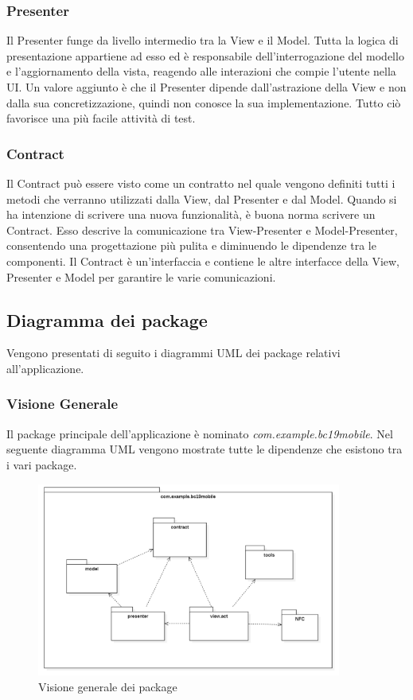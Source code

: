 \subsubsection{Presenter}
Il Presenter funge da livello intermedio tra la View e il Model. Tutta la logica di presentazione appartiene ad esso ed è responsabile dell'interrogazione del modello e l'aggiornamento della vista, reagendo alle interazioni che compie l'utente nella UI. Un valore aggiunto è che il Presenter dipende dall'astrazione della View e non dalla sua concretizzazione, quindi non conosce la sua implementazione. Tutto ciò favorisce una più facile attività di test.

\subsubsection{Contract}
Il Contract può essere visto come un contratto nel quale vengono definiti tutti i metodi che verranno utilizzati dalla View, dal Presenter e dal Model. Quando si ha intenzione di scrivere una nuova funzionalità, è buona norma scrivere un Contract. Esso descrive la comunicazione tra View-Presenter e Model-Presenter, consentendo una progettazione più pulita e diminuendo le dipendenze tra le componenti.
Il Contract è un'interfaccia e contiene le altre interfacce della View, Presenter e Model per garantire le varie comunicazioni.


\subsection{Diagramma dei package}
Vengono presentati di seguito i diagrammi UML dei package relativi all'applicazione.

\subsubsection{Visione Generale}
Il package principale dell'applicazione è nominato \textit{com.example.bc19mobile}.
Nel seguente diagramma UML vengono mostrate tutte le dipendenze che esistono tra i vari package.
\begin{figure}[H]
	\centering
	\includegraphics[width=10cm]{res/images/apputenti-packageGenerale.png}
	\caption{Visione generale dei package}
	\label{fig:Visione generale dei package}
\end{figure}

